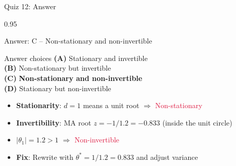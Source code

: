 \documentclass[9pt, aspectratio=169, t]{beamer}
\begin{document}
\begin{frame}{Quiz 12: Answer}
    \begin{cminipage}{0.95\textwidth}
    {\small
    \begin{exampleblock}{Answer: C -- Non-stationary and non-invertible}

        \vspace{0.1cm}

    \begin{block}{Answer choices}
        \textcolor{MainBlue}{\textbf{(A)}} Stationary and invertible \incorrect\\[3pt]
        \textcolor{MainBlue}{\textbf{(B)}} Non-stationary but invertible \incorrect\\[3pt]
        \textcolor{MainBlue}{\textbf{(C)}} \textbf{\textcolor{Forest}{Non-stationary and non-invertible}} \correct\\[3pt]
        \textcolor{MainBlue}{\textbf{(D)}} Stationary but non-invertible \incorrect
    \end{block}

        \vspace{0.2cm}

        \begin{itemize}
            \item \textbf{Stationarity}: $d=1$ means a unit root $\Rightarrow$ \textcolor{Crimson}{Non-stationary}
            \item \textbf{Invertibility}: MA root $z = -1/1.2 = -0.833$ (inside the unit circle)
            \item $|\theta_1| = 1.2 > 1$ $\Rightarrow$ \textcolor{Crimson}{Non-invertible}
            \item \textbf{Fix}: Rewrite with $\theta^* = 1/1.2 = 0.833$ and adjust variance
        \end{itemize}
    \end{exampleblock}
    }

    \end{cminipage}
\end{frame}
\end{document}
